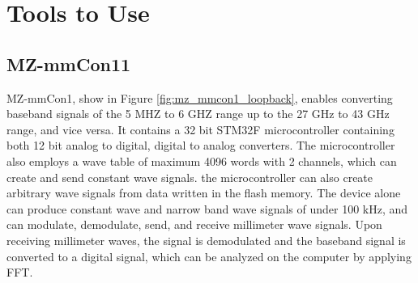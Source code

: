 \documentclass[a4paper,12pt]{report}
\begin{document}
\section{Tools to Use}

\subsection{MZ-mmCon11}

MZ-mmCon1, show in Figure \ref{fig:mz_mmcon1_loopback},
enables converting baseband signals of the 5 MHZ to 6 GHZ range
up to the 27 GHz to 43 GHz range, and vice versa.
It contains a 32 bit STM32F microcontroller
containing both 12 bit analog to digital, digital to analog converters.
The microcontroller also employs
a wave table of maximum 4096 words with 2 channels,
which can create and send constant wave signals.
the microcontroller can also create arbitrary wave signals from
data written in the flash memory.
The device alone can produce constant wave and narrow band wave signals
of under 100 kHz, and can modulate, demodulate, send, and receive
millimeter wave signals.
Upon receiving millimeter waves,
the signal is demodulated and the baseband signal is converted to a digital signal,
which can be analyzed on the computer by applying FFT.
\end{document}
